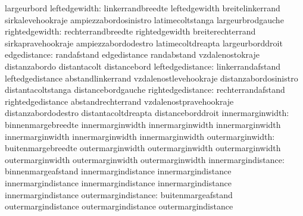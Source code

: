                                   largeurbord
                   leftedgewidth: linkerrandbreedte                leftedgewidth
                                  breitelinkerrand                 sirkalevehookraje
                                  ampiezzabordosinistro            latimecoltstanga
                                  largeurbrodgauche
                  rightedgewidth: rechterrandbreedte               rightedgewidth
                                  breiterechterrand                sirkapravehookraje
                                  ampiezzabordodestro              latimecoltdreapta
                                  largeurborddroit
                    edgedistance: randafstand                      edgedistance
                                  randabstand                      vzdalenostokraje
                                  distanzabordo                    distantacolt
                                  distancebord
                leftedgedistance: linkerrandafstand                leftedgedistance
                                  abstandlinkerrand                vzdalenostlevehookraje
                                  distanzabordosinistro            distantacoltstanga
                                  distancebordgauche
               rightedgedistance: rechterrandafstand               rightedgedistance
                                  abstandrechterrand               vzdalenostpravehookraje
                                  distanzabordodestro              distantacoltdreapta
                                  distanceborddroit
              innermarginwidth:   binnenmargebreedte               innermarginwidth
                                  innermarginwidth                 innermarginwidth
                                  innermarginwidth                 innermarginwidth
                                  innermarginwidth
              outermarginwidth:   buitenmargebreedte               outermarginwidth
                                  outermarginwidth                 outermarginwidth
                                  outermarginwidth                 outermarginwidth
                                  outermarginwidth
             innermargindistance: binnenmargeafstand               innermargindistance
                                  innermargindistance              innermargindistance
                                  innermargindistance              innermargindistance
                                  innermargindistance
             outermargindistance: buitenmargeafstand               outermargindistance
                                  outermargindistance              outermargindistance
